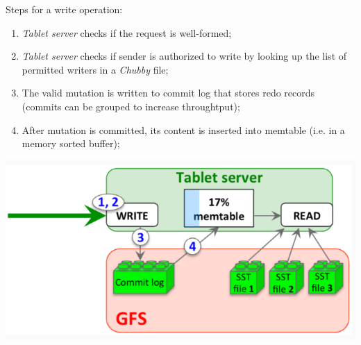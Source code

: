 \bigskip\noindent\begin{minipage}[c]{0.65\textwidth}
    Steps for a write operation:
    \begin{enumerate}
        \item \emph{Tablet server} checks if the request is well-formed;
        \item \emph{Tablet server} checks if sender is authorized to write by
        looking up the list of permitted writers in a \emph{Chubby} file;
        \item The valid mutation is written to commit log that stores redo
        records (commits can be grouped to increase throughtput);
        \item After mutation is committed, its content is inserted into
        memtable (i.e. in a memory sorted buffer);
    \end{enumerate}
\end{minipage}\hfill
\begin{minipage}[c]{0.33\textwidth}
    \includegraphics[width=\textwidth]{images/gbt-tablet-write.png}
\end{minipage}

